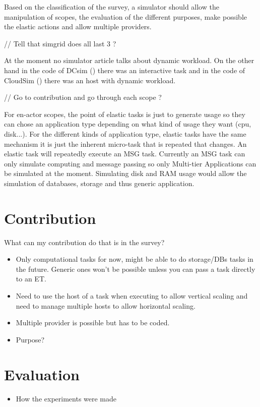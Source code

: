 \documentclass[a4paper]{IEEEtran}
\begin{document}
  Based on the classification of the survey, a simulator should allow the
  manipulation of scopes, the evaluation of the different purposes, make
  possible the elastic actions and allow multiple providers.
  
  // Tell that simgrid does all last 3 ?
  
  At the moment no simulator article talks about dynamic workload. On the other
  hand in the code of DCsim (\cite{tighe2013towards}) there was an interactive
  task and in the code of CloudSim (\cite{calheiros2011cloudsim}) there was an
  host with dynamic workload.
  
  // Go to contribution and go through each scope ?
  
  For en-actor scopes, the point of elastic tasks is just to generate usage
  so they can chose an application type depending on what kind of usage they
  want (cpu, disk...). For the different kinds of application type, elastic
  tasks have the same mechanism it is just the inherent micro-task that is
  repeated that changes. An elastic task will repeatedly execute an MSG task.
  Currently an MSG task can only simulate computing and message passing so
  only Multi-tier Applications can be simulated at the moment. Simulating
  disk and RAM usage would allow the simulation of databases, storage and
  thus generic application.
       

\section{Contribution} \label{contrib}
  What can my contribution do that is in the survey?
  \begin{itemize}
    \item Only computational tasks for now, might be able to do storage/DBs
    tasks in the future. Generic ones won't be possible unless you can pass a
    task directly to an ET.
    \item Need to use the host of a task when executing to allow vertical
    scaling and need to manage multiple hosts to allow horizontal scaling.
    \item Multiple provider is possible but has to be coded.
    \item Purpose?
  \end{itemize}

\section{Evaluation} \label{eval}
  \begin{itemize}
    \item How the experiments were made
  \end{itemize}
\end{document}
